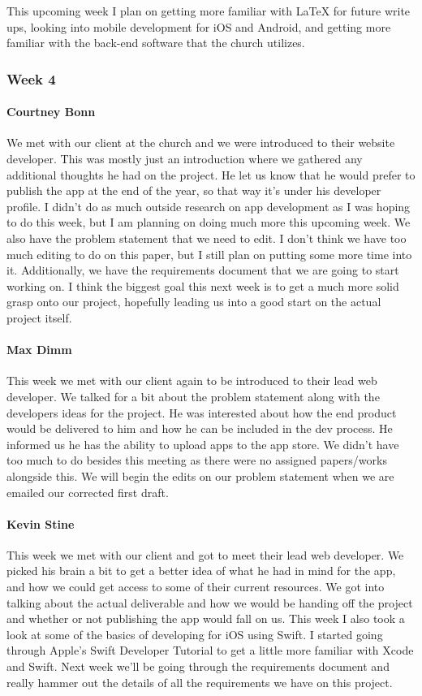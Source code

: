 This upcoming week I plan on getting more familiar with LaTeX for future write ups, looking into mobile development for iOS and Android, and getting more familiar with the back-end software that the church utilizes.

		\subsubsection{Week 4}

			\paragraph{Courtney Bonn}
			We met with our client at the church and we were introduced to their website developer. This was mostly just an introduction where we gathered any additional thoughts he had on the project. He let us know that he would prefer to publish the app at the end of the year, so that way it's under his developer profile. I didn't do as much outside research on app development as I was hoping to do this week, but I am planning on doing much more this upcoming week. We also have the problem statement that we need to edit. I don't think we have too much editing to do on this paper, but I still plan on putting some more time into it. Additionally, we have the requirements document that we are going to start working on. I think the biggest goal this next week is to get a much more solid grasp onto our project, hopefully leading us into a good start on the actual project itself.

			\paragraph{Max Dimm}
			This week we met with our client again to be introduced to their lead web developer. We talked for a bit about the problem statement along with the developers ideas for the project. He was interested about how the end product would be delivered to him and how he can be included in the dev process. He informed us he has the ability to upload apps to the app store. We didn't have too much to do besides this meeting as there were no assigned papers/works alongside this. We will begin the edits on our problem statement when we are emailed our corrected first draft.

			\paragraph{Kevin Stine}
			This week we met with our client and got to meet their lead web developer. We picked his brain a bit to get a better idea of what he had in mind for the app, and how we could get access to some of their current resources. We got into talking about the actual deliverable and how we would be handing off the project and whether or not publishing the app would fall on us. This week I also took a look at some of the basics of developing for iOS using Swift. I started going through Apple's Swift Developer Tutorial to get a little more familiar with Xcode and Swift. Next week we'll be going through the requirements document and really hammer out the details of all the requirements we have on this project.

